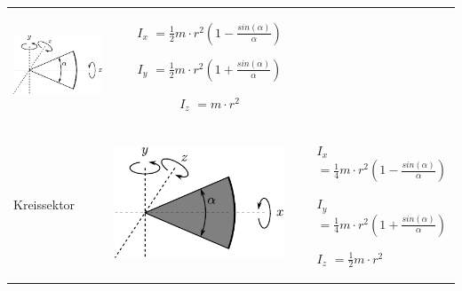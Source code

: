 \begin{table}[h!]
\begin{tabular}{m{2cm} c m{}}
\begin{minipage}{0.3\textwidth}
        \centering
        \includegraphics[scale=\traegscale]{../fig/traeg-kreisbogen.pdf}
        \end{minipage} &
                \begin{itemize}
                \item[$I_x$]$= \frac12 m \cdot r^2 
                        \left(1-\frac{sin(\alpha)}{\alpha} \right)$
                \item[$I_y$]$= \frac12 m \cdot r^2
                        \left(1+\frac{sin(\alpha)}{\alpha} \right)$
                \item[$I_z$]$= m \cdot r^2$
                \end{itemize} \\
Kreissektor &
        \begin{minipage}{0.3\textwidth}
        \centering
        \includegraphics[scale=\traegscale]{../fig/traeg-kreissektor.pdf}
        \end{minipage} &
                \begin{itemize}
                \item[$I_x$]$= \frac14 m \cdot r^2
                        \left(1-\frac{sin(\alpha)}{\alpha} \right)$
                \item[$I_y$]$= \frac14 m \cdot r^2
                        \left(1+\frac{sin(\alpha)}{\alpha} \right)$
                \item[$I_z$]$= \frac12 m \cdot r^2$        

\end{itemize}
\end{tabular}
\end{table}
